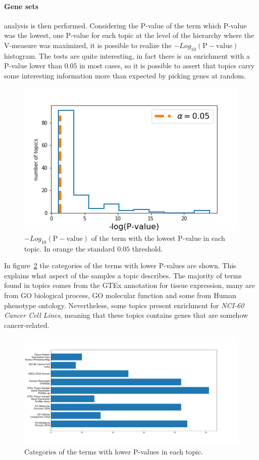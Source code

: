 \paragraph{Gene sets} analysis is then performed. Considering the P-value of the term which P-value was the lowest, one P-value for each topic at the level of the hierarchy where the V-measure was maximized, it is possible to realize the $-Log_{10}(\mathrm{P-value})$ histogram. The tests are quite interesting, in fact there is an enrichment with a P-value lower than $0.05$ in most cases, so it is possible to assert that topics carry some interesting information more than expected by picking genes at random.
\begin{figure}[htb!]
    \centering
    \includegraphics[width=0.65\linewidth]{pictures/topic/merged/pvaluescrosstopic.png}
    \caption{$-Log_{10}(\mathrm{P-value})$ of the term with the lowest P-value in each topic. In orange the standard $0.05$ threshold.}
    \label{fig:topic/merged/pvaluescrosstopic}
\end{figure}
In figure~\ref{fig:topic/merged/pvaluecategories} the categories of the terms with lower P-values are shown. This explains what aspect of the samples a topic describes. The majority of terms found in topics comes from the GTEx annotation for tissue expression, many are from GO biological process, GO molecular function and some from Human phenotype ontology. Nevertheless, some topics present enrichment for \textit{NCI-60 Cancer Cell Lines}, meaning that these topics contains genes that are somehow cancer-related.
\begin{figure}[htb!]
    \centering
    \includegraphics[width=0.8\linewidth]{pictures/topic/merged/pvaluecategories.pdf}
    \caption{Categories of the terms with lower P-values in each topic.}
    \label{fig:topic/merged/pvaluecategories}
\end{figure}

